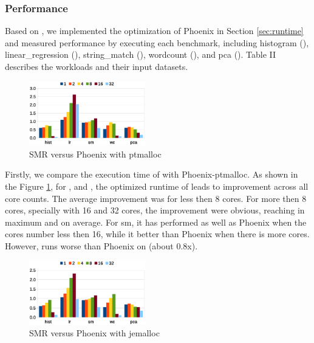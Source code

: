 \subsubsection{Performance}
Based on \myth, we implemented the optimization of Phoenix in Section \ref{sec:runtime} and measured \myds performance by executing each benchmark, including histogram (), linear\_regression (), string\_match (), wordcount (), and pca (). 
Table II describes the workloads and their input datasets. 
\begin{figure}[!h!t]  
	\centering
	\includegraphics[width=0.45\textwidth]{eps/dmr_time_array.eps}
	\caption{SMR versus Phoenix with ptmalloc}
	\label{fig:smr:time:ptmalloc}
\end{figure}

Firstly, we compare the execution time of \myds with Phoenix-ptmalloc. 
As shown in the Figure \ref{fig:smr:time:ptmalloc}, for ,  and , the optimized runtime of \myds leads to improvement across all core counts.
The average improvement was  for less then 8 cores.
For more then 8 cores, specially with 16 and 32 cores, the improvement were obvious, reaching  in maximum and  on average.
For sm, it has performed as well as Phoenix when the cores number less then 16, while it better than Phoenix when there is more cores.
However, \myds runs worse than Phoenix on  (about 0.8x).
\begin{figure}[!h!t]  
	\centering
	\includegraphics[width=0.45\textwidth]{eps/dmr_time_jemalloc.eps}
	\caption{SMR versus Phoenix with jemalloc}
	\label{fig:smr:time:jemalloc}
\end{figure}

